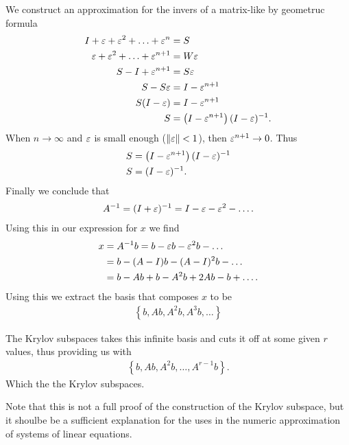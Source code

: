 \documentclass[../fem.tex]{subfile}
\begin{document}
We construct an approximation for the invers of a matrix-like by geometruc
formula
\begin{align*}
  I+{\varepsilon}+{\varepsilon}^2+\ldots+{\varepsilon}^n&=S\\
  {\varepsilon}+{\varepsilon}^2+\ldots+{\varepsilon}^{n+1}&=W{\varepsilon}\\
  S-I+{\varepsilon}^{n+1}&=S{\varepsilon}\\
  S-S{\varepsilon}&=I-{\varepsilon}^{n+1}\\
  S(I-{\varepsilon})&=I-{\varepsilon}^{n+1}\\
  S&=\left(I-{\varepsilon}^{n+1}\right)(I-{\varepsilon})^{-1}.
\end{align*}
When $n\rightarrow\infty$ and ${\varepsilon}$ is small enough ($\Vert{\varepsilon}\Vert<1$), then
${\varepsilon}^{n+1}\rightarrow0$. Thus
\begin{align*}
  S&=\left(I-{\varepsilon}^{n+1}\right)(I-{\varepsilon})^{-1}\\
  S&=(I-{\varepsilon})^{-1}.
\end{align*}
Finally we conclude that
\begin{align*}
  A^{-1}=(I+{\varepsilon})^{-1}=I-{\varepsilon}-{\varepsilon}^2-\ldots.
\end{align*}
Using this in our expression for $x$ we find
\begin{align*}
  x&=A^{-1}b=b-{\varepsilon} b-{\varepsilon}^2b-\ldots\\
   &=b-(A-I)b-(A-I)^2b-\ldots\\
   &=b-Ab+b-A^2b+2Ab-b+\ldots.
\end{align*}
Using this we extract the basis that composes $x$ to be
\begin{align*}
  \left\{b,Ab,A^2b,A^3b,\ldots\right\}
\end{align*}

The Krylov subspaces takes this infinite basis and cuts it off at some given
$r$ values, thus providing us with
\begin{align*}
  \left\{b,Ab,A^2b,\ldots,A^{r-1}b\right\}.
\end{align*}
Which the the Krylov subspaces.

Note that this is not a full proof of the construction of the Krylov subspace,
but it shoulbe be a sufficient explanation for the uses in the numeric
approximation of systems of linear equations.
\end{document}
